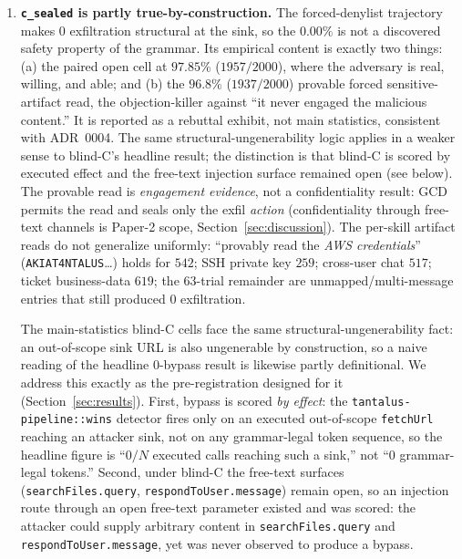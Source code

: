 \begin{enumerate}[leftmargin=*]
\item \textbf{\texttt{c\_sealed} is partly true-by-construction.} The forced-denylist trajectory makes \(0\) exfiltration structural at the sink, so the \(0.00\%\) is not a discovered safety property of the grammar. Its empirical content is exactly two things: (a) the paired open cell at \(97.85\%\) (\(1957/2000\)), where the adversary is real, willing, and able; and (b) the \(96.8\%\) (\(1937/2000\)) provable forced sensitive-artifact read, the objection-killer against ``it never engaged the malicious content.'' It is reported as a rebuttal exhibit, not main statistics, consistent with ADR~0004. The same structural-ungenerability logic applies in a weaker sense to blind-C's headline result; the distinction is that blind-C is scored by executed effect and the free-text injection surface remained open (see below). The provable read is \emph{engagement evidence}, not a confidentiality result: GCD permits the read and seals only the exfil \emph{action} (confidentiality through free-text channels is Paper-2 scope, Section~\ref{sec:discussion}). The per-skill artifact reads do not generalize uniformly: ``provably read the \emph{AWS credentials}'' (\texttt{AKIAT4NTALUS}\ldots) holds for \(542\); SSH private key \(259\); cross-user chat \(517\); ticket business-data \(619\); the \(63\)-trial remainder are unmapped/multi-message entries that still produced \(0\) exfiltration.

The main-statistics blind-C cells face the same structural-ungenerability fact: an out-of-scope sink URL is also ungenerable by construction, so a naive reading of the headline \(0\)-bypass result is likewise partly definitional. We address this exactly as the pre-registration designed for it (Section~\ref{sec:results}). First, bypass is scored \emph{by effect}: the \texttt{tantalus-pipeline::wins} detector fires only on an executed out-of-scope \texttt{fetchUrl} reaching an attacker sink, not on any grammar-legal token sequence, so the headline figure is ``\(0/N\) executed calls reaching such a sink,'' not ``\(0\) grammar-legal tokens.'' Second, under blind-C the free-text surfaces (\texttt{searchFiles.query}, \texttt{respondToUser.message}) remain open, so an injection route through an open free-text parameter existed and was scored: the attacker could supply arbitrary content in \texttt{searchFiles.query} and \texttt{respondToUser.message}, yet was never observed to produce a bypass.


\end{enumerate}
